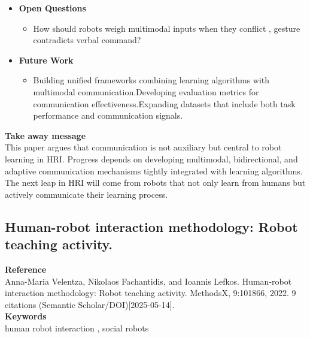 \documentclass[report.tex]{subfiles}
\begin{document}
\begin{itemize}
    \item \noindent\textbf {Open Questions}
    \begin{itemize}
        \item     How should robots weigh multimodal inputs when they conflict , gesture contradicts verbal command?

    \end{itemize}
    
    \item \noindent\textbf{Future Work}
    \begin{itemize}
        \item Building unified frameworks combining learning algorithms with multimodal communication.Developing evaluation metrics for communication effectiveness.Expanding datasets that include both task performance and communication signals.
        
    \end{itemize}
\end{itemize}


\noindent\textbf{Take away message}  \\
This paper argues that communication is not auxiliary but central to robot learning in HRI. Progress depends on developing multimodal, bidirectional, and adaptive communication mechanisms tightly integrated with learning algorithms. The next leap in HRI will come from robots that not only learn from humans but actively communicate their learning process.














\subsection{Human-robot interaction methodology:
Robot teaching activity.} 

\noindent\textbf{Reference} \\
\cite{velentza_human-robot_2022}Anna-Maria Velentza, Nikolaos Fachantidis, and Ioannis Lefkos. Human-robot interaction methodology: Robot teaching activity. MethodsX, 9:101866, 2022. 9 citations (Semantic Scholar/DOI)[2025-05-14].
\\


\noindent\textbf{Keywords} \\
human robot interaction , social robots 
   \\
\end{document}
